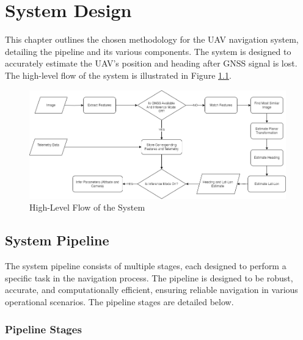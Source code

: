 

\chapter{System Design}

This chapter outlines the chosen methodology for the UAV navigation system, detailing the pipeline and its various components. The system is designed to accurately estimate the UAV's position and heading after GNSS signal is lost. The high-level flow of the system is illustrated in Figure \ref{fig:HighLevelFlow}.

\begin{figure}[H]
    \centering
    \includegraphics[width=0.99\textwidth]{Chapter 3/Chap3Figs/HighLevelFlow.png}
    \caption{High-Level Flow of the System}
    \label{fig:HighLevelFlow}
\end{figure}




\section{System Pipeline}
The system pipeline consists of multiple stages, each designed to perform a specific task in the navigation process. The pipeline is designed to be robust, accurate, and computationally efficient, ensuring reliable navigation in various operational scenarios. The pipeline stages are detailed below.

\subsection{Pipeline Stages}

